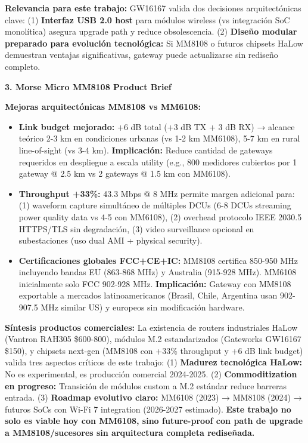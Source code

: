 \textbf{Relevancia para este trabajo:} GW16167 valida dos decisiones arquitectónicas clave: (1) \textbf{Interfaz USB 2.0 host} para módulos wireless (vs integración SoC monolítica) asegura upgrade path y reduce obsolescencia. (2) \textbf{Diseño modular preparado para evolución tecnológica:} Si MM8108 o futuros chipsets HaLow demuestran ventajas significativas, gateway puede actualizarse sin rediseño completo.

\textbf{3. Morse Micro MM8108 Product Brief}~\cite{morsemicroMM8108ProductBrief2025}

\textbf{Mejoras arquitectónicas MM8108 vs MM6108:}
\begin{itemize}
    \item \textbf{Link budget mejorado:} +6 dB total (+3 dB TX + 3 dB RX) → alcance teórico 2-3 km en condiciones urbanas (vs 1-2 km MM6108), 5-7 km en rural line-of-sight (vs 3-4 km). \textbf{Implicación:} Reduce cantidad de gateways requeridos en despliegue a escala utility (e.g., 800 medidores cubiertos por 1 gateway @ 2.5 km vs 2 gateways @ 1.5 km con MM6108).
    
    \item \textbf{Throughput +33\%:} 43.3 Mbps @ 8 MHz permite margen adicional para: (1) waveform capture simultáneo de múltiples DCUs (6-8 DCUs streaming power quality data vs 4-5 con MM6108), (2) overhead protocolo IEEE 2030.5 HTTPS/TLS sin degradación, (3) video surveillance opcional en subestaciones (uso dual AMI + physical security).
    
    \item \textbf{Certificaciones globales FCC+CE+IC:} MM8108 certifica 850-950 MHz incluyendo bandas EU (863-868 MHz) y Australia (915-928 MHz). MM6108 inicialmente solo FCC 902-928 MHz. \textbf{Implicación:} Gateway con MM8108 exportable a mercados latinoamericanos (Brasil, Chile, Argentina usan 902-907.5 MHz similar US) y europeos sin modificación hardware.
\end{itemize}

\textbf{Síntesis productos comerciales:} La existencia de routers industriales HaLow (Vantron RAH305 \$600-800), módulos M.2 estandarizados (Gateworks GW16167 \$150), y chipsets next-gen (MM8108 con +33\% throughput y +6 dB link budget) valida tres aspectos críticos de este trabajo: (1) \textbf{Madurez tecnológica HaLow:} No es experimental, es producción comercial 2024-2025. (2) \textbf{Commoditization en progreso:} Transición de módulos custom a M.2 estándar reduce barreras entrada. (3) \textbf{Roadmap evolutivo claro:} MM6108 (2023) → MM8108 (2024) → futuros SoCs con Wi-Fi 7 integration (2026-2027 estimado). \textbf{Este trabajo no solo es viable hoy con MM6108, sino future-proof con path de upgrade a MM8108/sucesores sin arquitectura completa rediseñada.}

